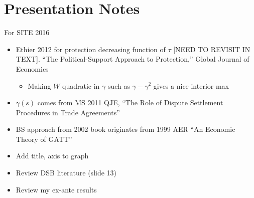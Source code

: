 \documentclass[12pt]{article}
\newcommand{\ga}{\gamma}
\begin{document}
\section{Presentation Notes}
For SITE 2016
\begin{itemize}
	\item Ethier 2012 for protection decreasing function of $\tau$ [NEED TO REVISIT IN TEXT]. ``The Political-Support Approach to Protection,'' Global Journal of Economics
		\begin{itemize}
			\item Making $W$ quadratic in $\ga$ such as $\ga - \ga^2$ gives a nice interior max
		\end{itemize}
	\item $\ga(s)$ comes from MS 2011 QJE, ``The Role of Dispute Settlement Procedures in Trade Agreements''
	\item BS approach from 2002 book originates from 1999 AER ``An Economic Theory of GATT''
	\item Add title, axis to graph
	\item Review DSB literature (slide 13)
	\item Review my ex-ante results
\end{itemize}
\end{document}
